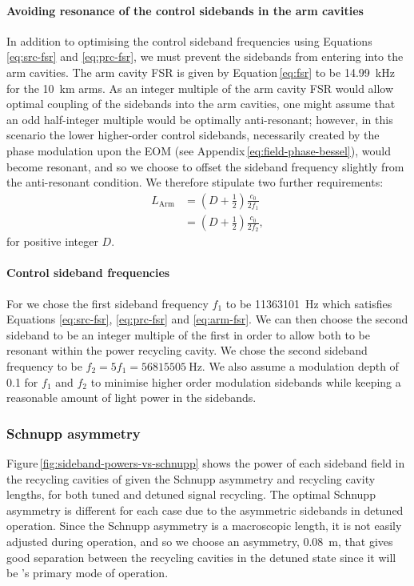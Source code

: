 \paragraph{Avoiding resonance of the control sidebands in the arm cavities}
In addition to optimising the control sideband frequencies using Equations \ref{eq:src-fsr} and \ref{eq:prc-fsr}, we must prevent the sidebands from entering into the arm cavities. The arm cavity \gls{FSR} is given by Equation\,\ref{eq:fsr} to be \SI{14.99}{\kilo\hertz} for the \SI{10}{\kilo\meter} arms. As an integer multiple of the arm cavity \gls{FSR} would allow optimal coupling of the sidebands into the arm cavities, one might assume that an odd half-integer multiple would be optimally anti-resonant; however, in this scenario the lower higher-order control sidebands, necessarily created by the phase modulation upon the \gls{EOM} (see Appendix\,\ref{eq:field-phase-bessel}), would become resonant, and so we choose to offset the sideband frequency slightly from the anti-resonant condition. We therefore stipulate two further requirements:
\begin{equation}
  \label{eq:arm-fsr}
  \begin{split}
    L_{\text{Arm}} &= \left(D + \frac{1}{2} \right) \frac{c_0}{2 f_1} \\
                   &= \left(D + \frac{1}{2} \right) \frac{c_0}{2 f_2},
  \end{split}
\end{equation}
for positive integer $D$.

\paragraph{Control sideband frequencies}
For \ETLF{} we chose the first sideband frequency $f_1$ to be \SI{11363101}{\hertz} which satisfies Equations \ref{eq:src-fsr}, \ref{eq:prc-fsr} and \ref{eq:arm-fsr}. We can then choose the second sideband to be an integer multiple of the first in order to allow both to be resonant within the power recycling cavity. We chose the second sideband frequency to be $f_2 = 5f_1 = \SI{56815505}{\hertz}$. We also assume a modulation depth of \num{0.1} for $f_1$ and $f_2$ to minimise higher order modulation sidebands while keeping a reasonable amount of light power in the sidebands.

\subsubsection{Schnupp asymmetry}
Figure\,\ref{fig:sideband-powers-vs-schnupp} shows the power of each sideband field in the recycling cavities of \ETLF{} given the Schnupp asymmetry and recycling cavity lengths, for both tuned and detuned signal recycling. The optimal Schnupp asymmetry is different for each case due to the asymmetric sidebands in detuned operation. Since the Schnupp asymmetry is a macroscopic length, it is not easily adjusted during operation, and so we choose an asymmetry, \SI{0.08}{\meter}, that gives good separation between the recycling cavities in the detuned state since it will be \ETLF{}'s primary mode of operation.

